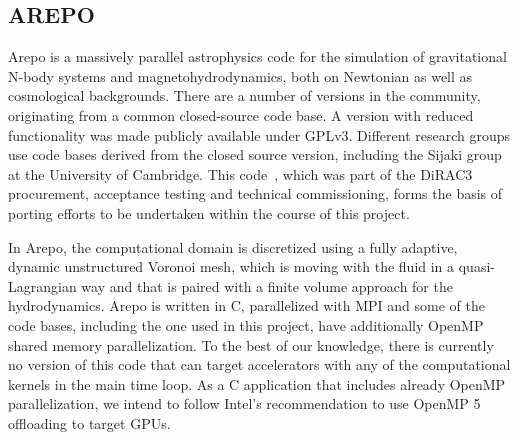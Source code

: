 \documentclass[../main]{subfiles}
\begin{document}
\subsection{AREPO}\label{sec:arepo}
Arepo is a massively parallel astrophysics code for the simulation of gravitational N-body systems and magnetohydrodynamics, both on Newtonian as well as cosmological backgrounds.
There are a number of versions in the community, originating from a common closed-source code base.
A version with reduced functionality was made publicly available under GPLv3\cite{weinberger_arepo_2020, springel_arepo_nodate}.
Different research groups use code bases derived from the closed source version, including the Sijaki group at the University of Cambridge.
This code~\cite{sijaki_arepo_nodate}, which was part of the DiRAC3 procurement, acceptance testing and technical commissioning, forms the basis of porting efforts to be undertaken within the course of this project.

In Arepo, the computational domain is discretized using a fully adaptive, dynamic unstructured Voronoi mesh, which is moving with the fluid in a quasi-Lagrangian way and that is paired with a finite volume approach for the hydrodynamics.
Arepo is written in C, parallelized with MPI and some of the code bases, including the one used in this project, have additionally OpenMP shared memory parallelization.
To the best of our knowledge, there is currently no version of this code that can target accelerators with any of the computational kernels in the main time loop.
As a C application that includes already OpenMP parallelization, we intend to follow Intel's recommendation to use OpenMP 5 offloading to target GPUs.
\end{document}
